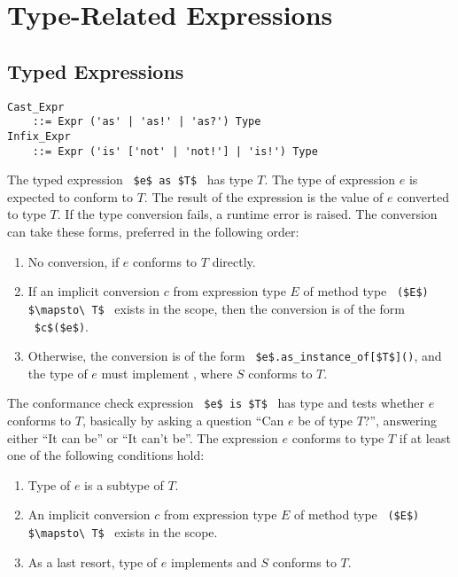 \section{Type-Related Expressions}





\subsection{Typed Expressions}
\label{sec:typed-expressions}

\grammar\begin{lstlisting}
Cast_Expr 
    ::= Expr ('as' | 'as!' | 'as?') Type
Infix_Expr 
    ::= Expr ('is' ['not' | 'not!'] | 'is!') Type
\end{lstlisting}

The typed expression ~\lstinline!$e$ as $T$!~ has type $T$. The type of expression $e$ is expected to conform to $T$. The result of the expression is the value of $e$ converted to type $T$. If the type conversion fails, a runtime error is raised. The conversion can take these forms, preferred in the following order:
\begin{enumerate}
  \item No conversion, if $e$ conforms to $T$ directly. 
  \item If an implicit conversion $c$ from expression type $E$ of method type ~\lstinline!($E$) $\mapsto\ T$!~ exists in the scope, then the conversion is of the form ~\lstinline!$c$($e$)!. 
  \item Otherwise, the conversion is of the form ~\lstinline!$e$.as_instance_of[$T$]()!, and the type of $e$ must implement , where $S$ conforms to $T$.
\end{enumerate}

The conformance check expression ~\lstinline!$e$ is $T$!~ has type  and tests whether $e$ conforms to $T$, basically by asking a question ``Can $e$ be of type $T$?'', answering either ``It can be'' or ``It can't be''. The expression $e$ conforms to type $T$ if at least one of the following conditions hold:
\begin{enumerate}
  \item Type of $e$ is a subtype of $T$. 
  \item An implicit conversion $c$ from expression type $E$ of method type ~\lstinline!($E$) $\mapsto\ T$!~ exists in the scope. 
  \item As a last resort, type of $e$ implements  and $S$ conforms to $T$.
\end{enumerate}

